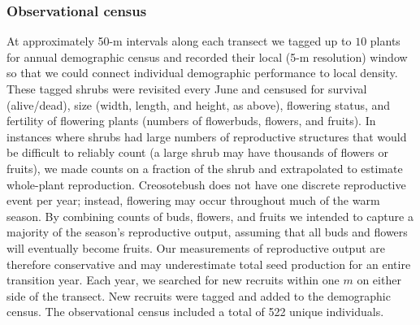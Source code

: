 \documentclass[11pt]{article}\usepackage[]{graphicx}\usepackage[usenames,dvipsnames]{xcolor}
\begin{document}
\subsubsection*{Observational census}
At approximately 50-m intervals along each transect we tagged up to $10$ plants for annual demographic census and recorded their local (5-m resolution) window so that we could connect individual demographic performance to local density. 
These tagged shrubs were revisited every June and censused for survival (alive/dead), size (width, length, and height, as above), flowering status, and fertility of flowering plants (numbers of flowerbuds, flowers, and fruits). 
In instances where shrubs had large numbers of reproductive structures that would be difficult to reliably count (a large shrub may have thousands of flowers or fruits), we made counts on a fraction of the shrub and extrapolated to estimate whole-plant reproduction. 
Creosotebush does not have one discrete reproductive event per year; instead, flowering may occur throughout much of the warm season. 
By combining counts of buds, flowers, and fruits we intended to capture a majority of the season's reproductive output, assuming that all buds and flowers will eventually become fruits. 
Our measurements of reproductive output are therefore conservative and may underestimate total seed production for an entire transition year. 
Each year, we searched for new recruits within one $m$ on either side of the transect.
New recruits were tagged and added to the demographic census. 
The observational census included a total of 522 unique individuals. 
\end{document}
